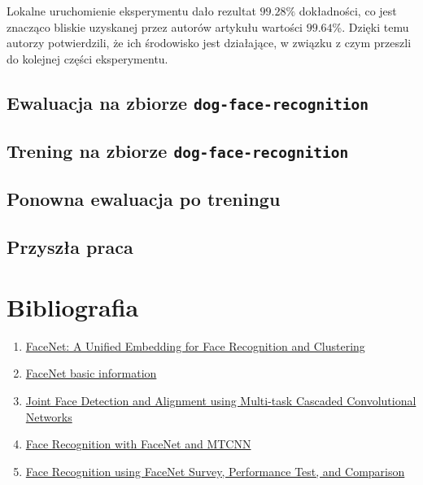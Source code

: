 \documentclass[11pt]{article}
\begin{document}
    Lokalne uruchomienie eksperymentu dało rezultat $99.28\%$ dokładności, co jest znacząco bliskie uzyskanej przez autorów artykułu wartości $99.64$\%.
    Dzięki temu autorzy potwierdzili, że ich środowisko jest działające, w związku z czym przeszli do kolejnej części eksperymentu.

    \subsection{Ewaluacja na zbiorze \texttt{dog-face-recognition}}

    \subsection{Trening na zbiorze \texttt{dog-face-recognition}}

    \subsection{Ponowna ewaluacja po treningu}

    \subsection{Przyszła praca}
    
    \section{Bibliografia}
    \begin{enumerate}
        \item \href{https://arxiv.org/abs/1503.03832}{FaceNet: A Unified Embedding for Face Recognition and Clustering}
        \item \href{https://en.wikipedia.org/wiki/FaceNet}{FaceNet basic information}
        \item \href{https://arxiv.org/abs/1604.02878}{Joint Face Detection and Alignment using Multi-task Cascaded Convolutional Networks}
        \item \href{https://medium.com/@culuma/face-recognition-with-facenet-and-mtcnn-11e77240adb6}{Face Recognition with FaceNet and MTCNN}
        \item \href{https://www.researchgate.net/profile/De-Rosal-Ignatius-Moses-Setiadi/publication/346417651_Study_Analysis_of_Human_Face_Recognition_using_Principal_Component_Analysis/links/605a0218458515e83467c633/Study-Analysis-of-Human-Face-Recognition-using-Principal-Component-Analysis.pdf}{Face Recognition using FaceNet Survey, Performance Test, and Comparison}
    \end{enumerate}
\end{document}
